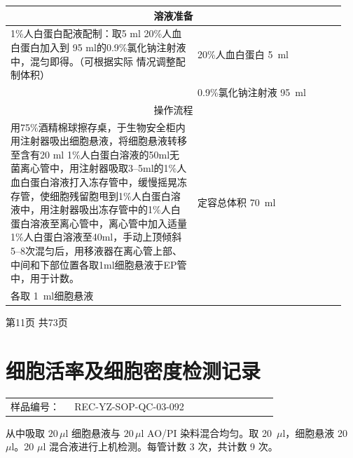 \documentclass[UTF8,10pt,a4paper,fontset=fandol]{ctexart}
\newcommand{\fieldvalue}[1]{#1}
\newcommand{\handwritten}[1]{#1}
\begin{document}
\begin{center}
\begin{tabular}{|p{0.53\linewidth}|p{0.42\linewidth}|}
\hline
\multicolumn{2}{|c|}{溶液准备}\\
\hline
1\%人白蛋白配液配制：取5 ml 20\%人血白蛋白加入到
95 ml的0.9\%氯化钠注射液中，混匀即得。（可根据实际
情况调整配制体积） &
20\%人血白蛋白
\fieldvalue{\handwritten{5}}\ ml\\
&
0.9\%氯化钠注射液
\fieldvalue{\handwritten{95}}\ ml\\
\hline
\multicolumn{2}{|c|}{操作流程}\\
\hline
用75\%酒精棉球擦存桌，于生物安全柜内用注射器吸出细胞悬液，将细胞悬液转移至含有20 ml 1\%人白蛋白溶液的50ml无菌离心管中，用注射器吸取3--5ml的1\%人血白蛋白溶液打入冻存管中，缓慢摇晃冻存管，使细胞残留胞甩到1\%人白蛋白溶液中，用注射器吸出冻存管中的1\%人白蛋白溶液至离心管中，离心管中加入适量1\%人白蛋白溶液至40ml，手动上顶倾斜5--8次混匀后，用移液器在离心管上部、中间和下部位置各取1ml细胞悬液于EP管中，用于计数。 &
定容总体积
\fieldvalue{\handwritten{70}}\ ml\\[0.5em]
各取
\fieldvalue{\handwritten{1}}\ ml细胞悬液\\
\hline
\end{tabular}
\end{center}

\begin{center}
第11页 共73页
\end{center}

\newpage

\section*{细胞活率及细胞密度检测记录}

\begin{tabular}{@{}p{0.22\linewidth}p{0.70\linewidth}@{}}
样品编号：&
\fieldvalue{REC-YZ-SOP-QC-03-092}
\\
\end{tabular}

从中吸取 $20\,\mu\mathrm{l}$ 细胞悬液与 $20\,\mu\mathrm{l}$ AO/PI 染料混合均匀。取
\fieldvalue{20}
\,$\mu\mathrm{l}$，细胞悬液
\fieldvalue{20}
\,$\mu\mathrm{l}$。20 $\mu\mathrm{l}$ 混合液进行上机检测。每管计数 3 次，共计数 9 次。
\end{document}
